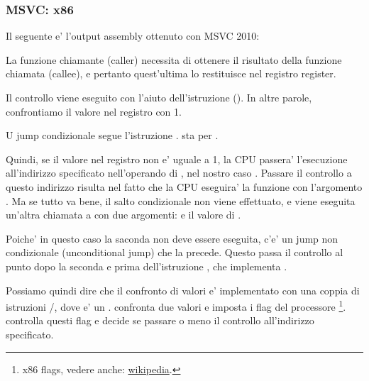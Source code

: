 \subsubsection{MSVC: x86}

Il seguente e' l'output assembly ottenuto con MSVC 2010:



La funzione chiamante (\gls{caller}) \main necessita di ottenere il risultato della funzione chiamata (\gls{callee}), 
e pertanto quest'ultima lo restituisce nel registro \EAX register.

Il controllo viene eseguito con l'aiuto dell'istruzione  (). In altre parole, confrontiamo il valore nel registro \EAX con 1.

U jump condizionale \JNE segue l'istruzione \CMP. \JNE sta per .

Quindi, se il valore nel registro \EAX non e' uguale a 1, la \ac{CPU} passera' l'esecuzione all'indirizzo specificato nell'operando di \JNE, nel nostro caso .
Passare il controllo a questo indirizzo risulta nel fatto che la \ac{CPU} eseguira' la funzione \printf con l'argomento .
Ma se tutto va bene, il salto condizionale non viene effettuato, e viene eseguita un'altra chiamata a \printf con due argomenti:  e il valore di .

Poiche' in questo caso la saconda \printf non deve essere eseguita, c'e' un jump non condizionale (unconditional jump) \JMP che la precede. 
Questo passa il controllo al punto dopo la seconda \printf e prima dell'istruzione , che implementa .

Possiamo quindi dire che il confronto di valori e'  implementato con una coppia di istruzioni \CMP/\Jcc, dove  e' un .
\CMP confronta due valori e imposta i flag del processore \footnote{x86 flags, vedere anche: \href{http://go.yurichev.com/17120}{wikipedia}.}.
\Jcc controlla questi flag e decide se passare o meno il controllo all'indirizzo specificato.

